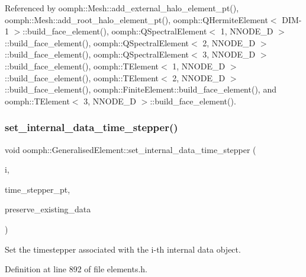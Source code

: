 Referenced by oomph\+::\+Mesh\+::add\+\_\+external\+\_\+halo\+\_\+element\+\_\+pt(), oomph\+::\+Mesh\+::add\+\_\+root\+\_\+halo\+\_\+element\+\_\+pt(), oomph\+::\+Q\+Hermite\+Element$<$ D\+I\+M-\/1 $>$\+::build\+\_\+face\+\_\+element(), oomph\+::\+Q\+Spectral\+Element$<$ 1, N\+N\+O\+D\+E\+\_\+D $>$\+::build\+\_\+face\+\_\+element(), oomph\+::\+Q\+Spectral\+Element$<$ 2, N\+N\+O\+D\+E\+\_\+D $>$\+::build\+\_\+face\+\_\+element(), oomph\+::\+Q\+Spectral\+Element$<$ 3, N\+N\+O\+D\+E\+\_\+D $>$\+::build\+\_\+face\+\_\+element(), oomph\+::\+T\+Element$<$ 1, N\+N\+O\+D\+E\+\_\+D $>$\+::build\+\_\+face\+\_\+element(), oomph\+::\+T\+Element$<$ 2, N\+N\+O\+D\+E\+\_\+D $>$\+::build\+\_\+face\+\_\+element(), oomph\+::\+Finite\+Element\+::build\+\_\+face\+\_\+element(), and oomph\+::\+T\+Element$<$ 3, N\+N\+O\+D\+E\+\_\+D $>$\+::build\+\_\+face\+\_\+element().

\mbox{\label{classoomph_1_1GeneralisedElement_a17a0ab600e97a50352a5ef696907a625}} 
\subsubsection{\texorpdfstring{set\+\_\+internal\+\_\+data\+\_\+time\+\_\+stepper()}{set\_internal\_data\_time\_stepper()}}
{\footnotesize\ttfamily void oomph\+::\+Generalised\+Element\+::set\+\_\+internal\+\_\+data\+\_\+time\+\_\+stepper (\begin{DoxyParamCaption}\item[{const unsigned \&}]{i,  }\item[{\hyperlink{classoomph_1_1TimeStepper}{Time\+Stepper} $\ast$const \&}]{time\+\_\+stepper\+\_\+pt,  }\item[{const bool \&}]{preserve\+\_\+existing\+\_\+data }\end{DoxyParamCaption})\hspace{0.3cm}{\ttfamily [inline]}}



Set the timestepper associated with the i-\/th internal data object. 



Definition at line 892 of file elements.\+h.



